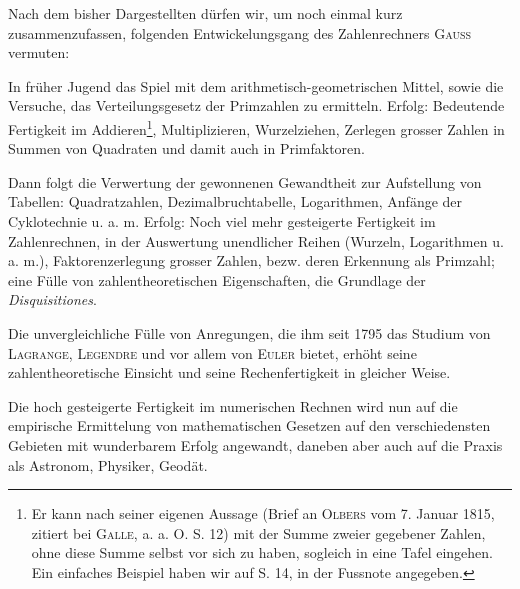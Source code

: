 Nach dem bisher Dargestellten dürfen wir, um noch einmal kurz zusammenzufassen, folgenden Entwickelungsgang des Zahlenrechners \textsc{Gauss} vermuten:

In früher Jugend das Spiel mit dem arithmetisch-geometrischen Mittel,
sowie die Versuche, das Verteilungsgesetz der Primzahlen zu ermitteln. Erfolg: Bedeutende Fertigkeit im Addieren\footnote{Er kann nach seiner eigenen Aussage (Brief an \textsc{Olbers} vom 7. Januar 1815, zitiert bei \textsc{Galle},
a. a. O. S. 12) mit der Summe zweier gegebener Zahlen, ohne diese Summe selbst vor sich zu haben, sogleich in eine Tafel eingehen. Ein einfaches Beispiel haben wir auf S. 14, in der Fussnote angegeben.}, Multiplizieren, Wurzelziehen, Zerlegen grosser Zahlen in Summen von Quadraten und damit auch in Primfaktoren.

Dann folgt die Verwertung der gewonnenen Gewandtheit zur Aufstellung
von Tabellen: Quadratzahlen, Dezimalbruchtabelle, Logarithmen, Anfänge der
Cyklotechnie u. a. m. Erfolg: Noch viel mehr gesteigerte Fertigkeit im Zahlenrechnen, in der Auswertung unendlicher Reihen (Wurzeln, Logarithmen u. a. m.),
Faktorenzerlegung grosser Zahlen, bezw. deren Erkennung als Primzahl; eine
Fülle von zahlentheoretischen Eigenschaften, die Grundlage der \textit{Disquisitiones}.

Die unvergleichliche Fülle von Anregungen, die ihm seit 1795 das Studium
von \textsc{Lagrange}, \textsc{Legendre} und vor allem von \textsc{Euler} bietet, erhöht seine zahlentheoretische Einsicht und seine Rechenfertigkeit in gleicher Weise.

Die hoch gesteigerte Fertigkeit im numerischen Rechnen wird nun auf
die empirische Ermittelung von mathematischen Gesetzen auf den verschiedensten Gebieten mit wunderbarem Erfolg angewandt, daneben aber auch auf
die Praxis als Astronom, Physiker, Geodät.

